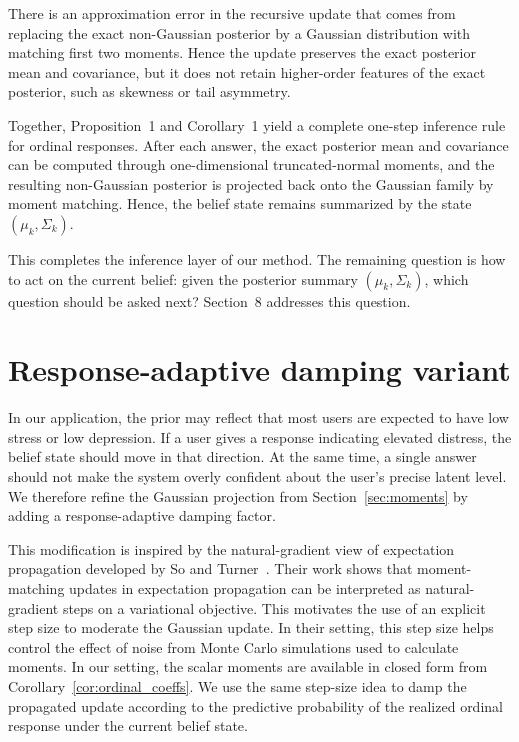 \documentclass{article}
\begin{document}
\begin{remark}
There is an approximation error in the recursive update that comes from
replacing the exact non-Gaussian posterior by a Gaussian distribution with
matching first two moments. Hence the update preserves the exact posterior mean
and covariance, but it does not retain higher-order features of the exact
posterior, such as skewness or tail asymmetry.
\end{remark}

Together, Proposition~1 and Corollary~1 yield a complete one-step inference rule for ordinal
responses. After each answer, the exact posterior mean and covariance can be computed through
one-dimensional truncated-normal moments, and the resulting non-Gaussian posterior is projected
back onto the Gaussian family by moment matching. Hence, the belief state remains summarized
by the state $(\mu_k,\Sigma_k)$.

This completes the inference layer of our method. The remaining question is how to act on the current belief: given the posterior summary
$(\mu_k,\Sigma_k)$, which question should be asked next? Section~8 addresses this question.


\section{Response-adaptive damping variant}
\label{sec:damped_gaussian_projection}

In our application, the prior may reflect that most users are expected to have low
stress or low depression. If a user gives a response indicating elevated distress,
the belief state should move in that direction. At the same time, a single answer
should not make the system overly confident about the user’s precise latent level.
We therefore refine the Gaussian projection from
Section~\ref{sec:moments} by adding a response-adaptive damping factor.

This modification is inspired by the natural-gradient view of expectation propagation developed by So
and Turner~\cite{so2024fearless}. Their work shows that moment-matching updates in
expectation propagation can be interpreted as natural-gradient steps on a
variational objective. This motivates the use of an explicit step size to moderate
the Gaussian update. In their setting, this step size
helps control the effect of noise from Monte Carlo simulations used to calculate moments. In our setting, the scalar moments
are available in closed form from Corollary~\ref{cor:ordinal_coeffs}. We use the
same step-size idea to damp the propagated update according to the predictive
probability of the realized ordinal response under the current belief state. 
\end{document}
